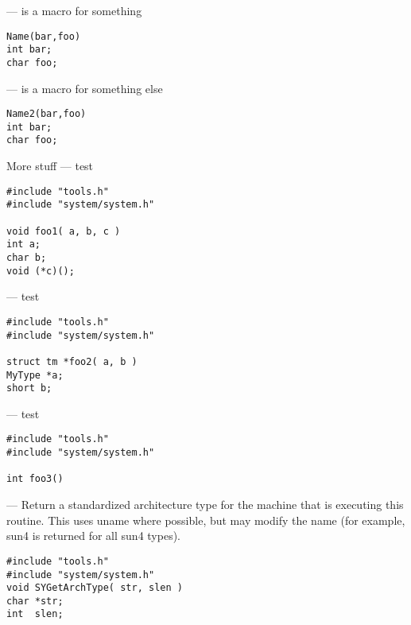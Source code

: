 \par
{}
\endmanpage
\startmanpage
{}
--- is a macro for something 
\startvb\begin{verbatim}
Name(bar,foo)
int bar;
char foo;
\end{verbatim}
\endvb

\endmanpage
\startmanpage
{}
--- is a macro for something else 
\startvb\begin{verbatim}
Name2(bar,foo)
int bar;
char foo;
\end{verbatim}
\endvb
More stuff
\endmanpage
\startmanpage
{}
--- test  
\startvb\begin{verbatim}
#include "tools.h"
#include "system/system.h"

void foo1( a, b, c )
int a;
char b;
void (*c)();
\end{verbatim}
\endvb

\endmanpage
\startmanpage
{}
--- test  
\startvb\begin{verbatim}
#include "tools.h"
#include "system/system.h"

struct tm *foo2( a, b )
MyType *a;
short b;
\end{verbatim}
\endvb

\endmanpage
\startmanpage
{}
--- test 
\startvb\begin{verbatim}
#include "tools.h"
#include "system/system.h"

int foo3()
\end{verbatim}
\endvb

\endmanpage
\startmanpage
{}
--- Return a standardized architecture type for the machine that is executing this routine.  This uses uname where possible, but may modify the name (for example, sun4 is returned for all sun4 types). 
\startvb\begin{verbatim}
#include "tools.h"
#include "system/system.h"
void SYGetArchType( str, slen )
char *str;
int  slen;
\end{verbatim}
\endvb

